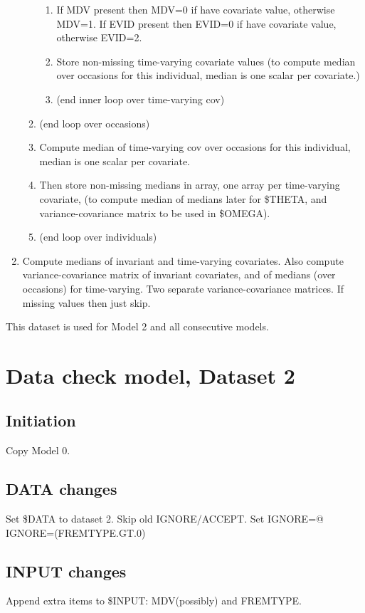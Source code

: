 \begin{enumerate}
\begin{enumerate}
\begin{enumerate}
    \item If MDV present then MDV=0 if have covariate value, otherwise MDV=1. 
    If EVID present then EVID=0 if have covariate value, otherwise EVID=2. 
    \item Store non-missing time-varying covariate values (to compute median over occasions for this individual, 
    median is one scalar per covariate.) 
    \item[] (end inner loop over time-varying cov)
\end{enumerate}
\item[] (end loop over occasions)
\item Compute median of time-varying cov over occasions for this individual, median is one scalar per covariate.
\item Then store non-missing medians in array, one array per time-varying covariate, (to compute 
median of medians later for \$THETA, and variance-covariance matrix  to be used in \$OMEGA).
\item[] (end loop over individuals)
\end{enumerate}

	\item Compute medians of invariant and time-varying covariates. Also compute variance-covariance matrix of invariant covariates, and of medians (over occasions) for time-varying. Two separate variance-covariance matrices. If missing values then just skip.
\end{enumerate}

This dataset is used for Model 2 and all consecutive models.

\section{Data check model, Dataset 2}
\subsection{Initiation}
Copy Model 0.

\subsection{DATA changes}
Set \$DATA to dataset 2. Skip old IGNORE/ACCEPT. Set IGNORE=@ IGNORE=(FREMTYPE.GT.0)

\subsection{INPUT changes}
Append extra items to \$INPUT: MDV(possibly) and FREMTYPE.

